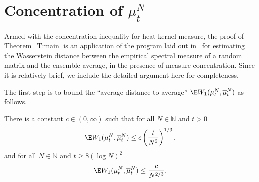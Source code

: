 \section{Concentration of \texorpdfstring{$\mu_t^N$}{mu t N}}\label{s.concentration}

Armed with the concentration inequality for heat kernel measure, the proof of Theorem~\ref{T:main} is an application of the program laid out in~\cite{MM2016} for estimating the Wasserstein distance between the empirical spectral measure of a random matrix and the ensemble average, in the presence of measure concentration. Since it is relatively brief, we include the detailed argument here for completeness.

The first step is to bound the ``average distance to average'' $\E W_1(\mu^N_t,\overline{\mu}^N_t)$ as follows.

\begin{prop}\label{T:avg-to-avg}
There is a constant $c\in(0,\infty)$ such that for all $N\in\mathbb{N}$ and $t>0$
\[
\E W_1(\mu^N_t,\overline{\mu}^N_t)\le c\left(\frac{t}{N^2}\right)^{1/3},
\]
and for all $N\in\mathbb{N}$ and $t\ge8(\log N)^2$
\[
\E W_1(\mu^N_t,\overline{\mu}^N_t)\le
\frac{c}{N^{2/3}}.
\]
\end{prop}

